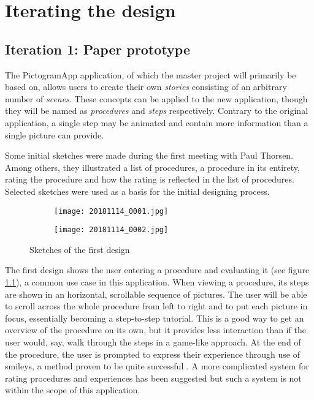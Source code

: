 \chapter{Iterating the design}
\label{ch:iterating}

\section{Iteration 1: Paper prototype}
\label{sec:iteration1}

The PictogramApp application, of which the master project will primarily be based on, allows users to create their own \emph{stories} consisting of an arbitrary number of \emph{scenes}. These concepts can be applied to the new application, though they will be named as \emph{procedures} and \emph{steps} respectively. Contrary to the original application, a single step may be animated and contain more information than a single picture can provide.

Some initial sketches were made during the first meeting with Paul Thorsen. Among others, they illustrated a list of procedures, a procedure in its entirety, rating the procedure and how the rating is reflected in the list of procedures. Selected sketches were used as a basis for the initial designing process.

\begin{figure}
    \centering
    \begin{subfigure}{0.95\textwidth}
        \centering
        \texttt{[image: 20181114\_0001.jpg]}
        \label{fig:sketch-viewprocedure}
    \end{subfigure}
    \begin{subfigure}{0.95\textwidth}
        \centering
        \texttt{[image: 20181114\_0002.jpg]}
        \label{fig:sketch-editprocedure}
    \end{subfigure}
    \caption{Sketches of the first design}
    \label{fig:sketch-firstdesign}
\end{figure}

The first design shows the user entering a procedure and evaluating it (see figure \ref{fig:sketch-viewprocedure}), a common use case in this application. When viewing a procedure, its steps are shown in an horizontal, scrollable sequence of pictures. The user will be able to scroll across the whole procedure from left to right and to put each picture in focus, essentially becoming a step-to-step tutorial. This is a good way to get an overview of the procedure on its own, but it provides less interaction than if the user would, say, walk through the steps in a game-like approach. At the end of the procedure, the user is prompted to express their experience through use of smileys, a method proven to be quite successful \parencite{stalberg2016}. A more complicated system for rating procedures and experiences has been suggested but such a system is not within the scope of this application.

